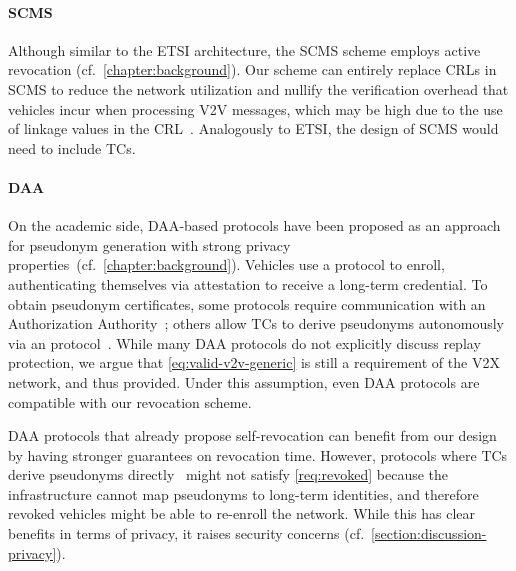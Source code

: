 \paragraph{SCMS}
%
Although similar to the ETSI architecture, the \ac{SCMS} scheme employs active
revocation (cf.~\cref{chapter:background}). Our scheme can entirely replace
\acp{CRL} in \ac{SCMS} to reduce the network utilization and nullify the
verification overhead that vehicles incur when processing \ac{V2V} messages,
which may be high due to the use of linkage values in the
\ac{CRL}~\cite{brecht2018scms}. Analogously to ETSI, the design of \ac{SCMS}
would need to include \acp{TC}.

\paragraph{DAA}
%
On the academic side, \ac{DAA}-based protocols have been proposed as an approach
for pseudonym generation with strong privacy
properties~(cf.~\cref{chapter:background}). Vehicles use a \funcjoin{} protocol
to enroll, authenticating themselves via attestation to receive a long-term
credential. To obtain pseudonym certificates, some protocols require
communication with an Authorization Authority~\cite{hicks2020vehicular}; others
allow \acp{TC} to derive pseudonyms autonomously via an \funcissue{}
protocol~\cite{whitefield2017privacy,desmoulins2019practical}. While many
\ac{DAA} protocols do not explicitly discuss replay protection, we argue that
\cref{eq:valid-v2v-generic} is still a requirement of the \ac{V2X} network, and
thus provided. Under this assumption, even \ac{DAA} protocols are compatible
with our revocation scheme.

\ac{DAA} protocols that already propose self-revocation can benefit from our
design by having stronger guarantees on revocation time. However, protocols
where \acp{TC} derive pseudonyms
directly~\cite{whitefield2017privacy,desmoulins2019practical} might not satisfy
\cref{req:revoked} because the infrastructure cannot map pseudonyms to long-term
identities, and therefore revoked vehicles might be able to re-enroll the
network. While this has clear benefits in terms of privacy, it raises security
concerns (cf.~\cref{section:discussion-privacy}).

